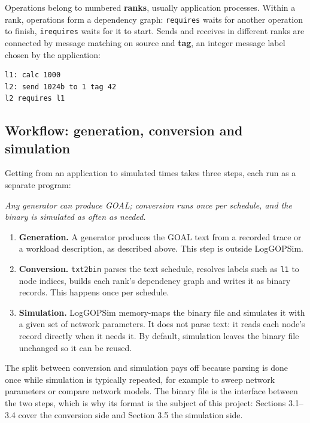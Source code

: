 \documentclass[10pt,a4paper]{article}
\begin{document}
Operations belong to numbered \textbf{ranks}, usually application processes. Within a rank, operations form a dependency graph: \texttt{requires} waits for another operation to finish, \texttt{irequires} waits for it to start. Sends and receives in different ranks are connected by message matching on source and \textbf{tag}, an integer message label chosen by the application:

\begin{lstlisting}
l1: calc 1000
l2: send 1024b to 1 tag 42
l2 requires l1
\end{lstlisting}

\hypertarget{workflow-generation-conversion-and-simulation}{}
\subsection{Workflow: generation, conversion and simulation}

Getting from an application to simulated times takes three steps, each run as a separate program:

\begin{center}
\resizebox{\linewidth}{!}{}
\par\nopagebreak\small\itshape Any generator can produce GOAL; conversion runs once per schedule, and the binary is simulated as often as needed.
\end{center}

\begin{enumerate}
\item \textbf{Generation.} A generator produces the GOAL text from a recorded trace or a workload description, as described above. This step is outside LogGOPSim.
\item \textbf{Conversion.} \texttt{txt2bin} parses the text schedule, resolves labels such as \texttt{l1} to node indices, builds each rank's dependency graph and writes it as binary records. This happens once per schedule.
\item \textbf{Simulation.} LogGOPSim memory-maps the binary file and simulates it with a given set of network parameters. It does not parse text: it reads each node's record directly when it needs it. By default, simulation leaves the binary file unchanged so it can be reused.
\end{enumerate}

The split between conversion and simulation pays off because parsing is done once while simulation is typically repeated, for example to sweep network parameters or compare network models. The binary file is the interface between the two steps, which is why its format is the subject of this project: Sections 3.1--3.4 cover the conversion side and Section 3.5 the simulation side.
\end{document}
